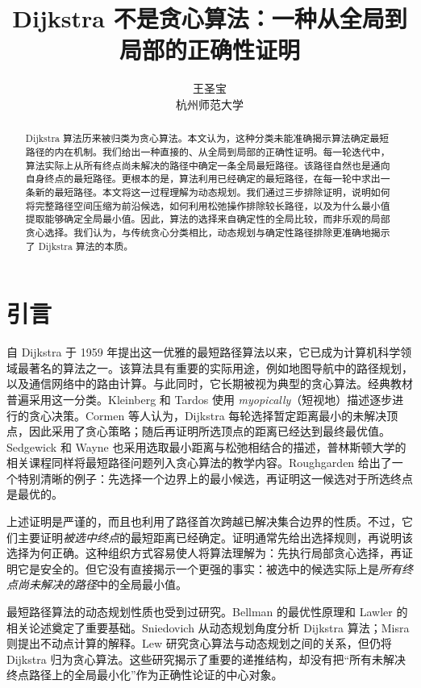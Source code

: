 \documentclass[UTF8,11pt,a4paper]{ctexart}
\title{\textbf{Dijkstra 不是贪心算法：一种从全局到局部的正确性证明}}
\author{王圣宝\\\small 杭州师范大学}
\date{}
\begin{document}
\maketitle
\vspace{-2.5em}
\begin{abstract}
Dijkstra 算法历来被归类为贪心算法。本文认为，这种分类未能准确揭示算法确定最短路径的内在机制。我们给出一种直接的、从全局到局部的正确性证明。每一轮迭代中，算法实际上从所有终点尚未解决的路径中确定一条全局最短路径。该路径自然也是通向自身终点的最短路径。更根本的是，算法利用已经确定的最短路径，在每一轮中求出一条新的最短路径。本文将这一过程理解为动态规划。我们通过三步排除证明，说明如何将完整路径空间压缩为前沿候选，如何利用松弛操作排除较长路径，以及为什么最小值提取能够确定全局最小值。因此，算法的选择来自确定性的全局比较，而非乐观的局部贪心选择。我们认为，与传统贪心分类相比，动态规划与确定性路径排除更准确地揭示了 Dijkstra 算法的本质。
\end{abstract}
\section{引言}
自 Dijkstra 于 1959 年提出这一优雅的最短路径算法以来\cite{Dijkstra1959}，它已成为计算机科学领域最著名的算法之一。该算法具有重要的实际用途，例如地图导航中的路径规划，以及通信网络中的路由计算\cite{SedgewickWayne2011}。与此同时，它长期被视为典型的贪心算法。经典教材普遍采用这一分类\cite{BrassardBratley1988,KleinbergTardos2006,CLRS2022}。Kleinberg 和 Tardos 使用 \emph{myopically}（短视地）描述逐步进行的贪心决策。Cormen 等人认为，Dijkstra 每轮选择暂定距离最小的未解决顶点，因此采用了贪心策略；随后再证明所选顶点的距离已经达到最终最优值。Sedgewick 和 Wayne 也采用选取最小距离与松弛相结合的描述，普林斯顿大学的相关课程同样将最短路径问题列入贪心算法的教学内容\cite{SedgewickWayne2011,WayneCOS423}。Roughgarden 给出了一个特别清晰的例子：先选择一个边界上的最小候选，再证明这一候选对于所选终点是最优的\cite{Roughgarden2018}。

上述证明是严谨的，而且也利用了路径首次跨越已解决集合边界的性质。不过，它们主要证明\emph{被选中终点}的最短距离已经确定。证明通常先给出选择规则，再说明该选择为何正确。这种组织方式容易使人将算法理解为：先执行局部贪心选择，再证明它是安全的。但它没有直接揭示一个更强的事实：被选中的候选实际上是\emph{所有终点尚未解决的路径}中的全局最小值。

最短路径算法的动态规划性质也受到过研究。Bellman 的最优性原理和 Lawler 的相关论述奠定了重要基础\cite{Bellman1957,Lawler1976}。Sniedovich 从动态规划角度分析 Dijkstra 算法；Misra 则提出不动点计算的解释\cite{Sniedovich2006,Misra2001}。Lew 研究贪心算法与动态规划之间的关系，但仍将 Dijkstra 归为贪心算法\cite{Lew2006}。这些研究揭示了重要的递推结构，却没有把“所有未解决终点路径上的全局最小化”作为正确性论证的中心对象。
\end{document}
